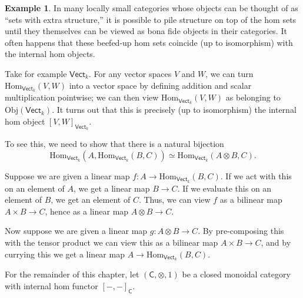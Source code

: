 \documentclass[a4paper]{report}
\newcommand{\Obj}{\mathrm{Obj}}
\newcommand{\Hom}{\mathrm{Hom}}
\theoremstyle{definition}
\newtheorem{example}{Example}[section]
\theoremstyle{plain}
\theoremstyle{remark}
\begin{document}
\begin{example}
  In many locally small categories whose objects can be thought of as ``sets with extra structure,'' it is possible to pile structure on top of the hom sets until they themselves can be viewed as bona fide objects in their categories. It often happens that these beefed-up hom sets coincide (up to isomorphism) with the internal hom objects.

  Take for example $\mathsf{Vect}_{k}$. For any vector spaces $V$ and $W$, we can turn $\Hom_{\mathsf{Vect}_{k}}(V, W)$ into a vector space by defining addition and scalar multiplication pointwise; we can then view $\Hom_{\mathsf{Vect}_{k}}(V, W)$ as belonging to $\Obj(\mathsf{Vect}_{k})$. It turns out that this is precisely (up to isomorphism) the internal hom object $[V, W]_{\mathsf{Vect}_{k}}$.

  To see this, we need to show that there is a natural bijection 
  \begin{equation*}
    \Hom_{\mathsf{Vect}_{k}}(A, \Hom_{\mathsf{Vect}_{k}}(B, C)) \simeq \Hom_{\mathsf{Vect}_{k}}(A \otimes B, C).
  \end{equation*}

  Suppose we are given a linear map $f\colon A \to \Hom_{\mathsf{Vect}_{k}}(B, C)$. If we act with this on an element of $A$, we get a linear map $B \to C$. If we evaluate this on an element of $B$, we get an element of $C$. Thus, we can view $f$ as a bilinear map $A \times B \to C$, hence as a linear map $A \otimes B \to C$.

  Now suppose we are given a linear map $g\colon A \otimes B \to C$. By pre-composing this with the tensor product we can view this as a bilinear map $A \times B \to C$, and by currying this we get a linear map $A \to \Hom_{\mathsf{Vect}_{k}}(B, C)$.
\end{example}

For the remainder of this chapter, let $(\mathsf{C}, \otimes, 1)$ be a closed monoidal category with internal hom functor $[-,-]_{\mathsf{C}}$.
\end{document}
